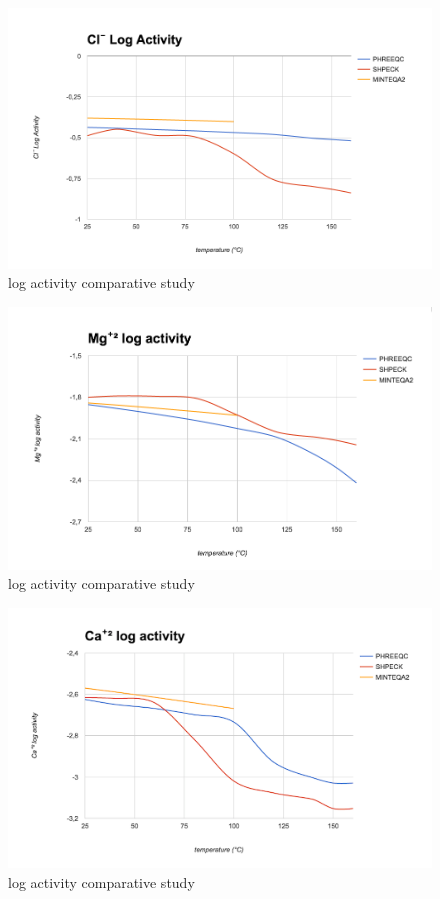 \documentclass[preprint,12pt,3p]{elsarticle}
\begin{document}
\begin{figure}[ht!]
\centering
\includegraphics[width=140mm]{cl-.png}
\caption{ log activity comparative study}
\label{fig:cl-}
\end{figure}

\begin{figure}[ht!]
\centering
\includegraphics[width=140mm]{mg+2.png}
\caption{ log activity comparative study}
\label{fig:mg+2}
\end{figure}

\begin{figure}[ht!]
\centering
\includegraphics[width=140mm]{ca+2.png}
\caption{ log activity comparative study}
\label{fig:ca+2}
\end{figure}
\end{document}
